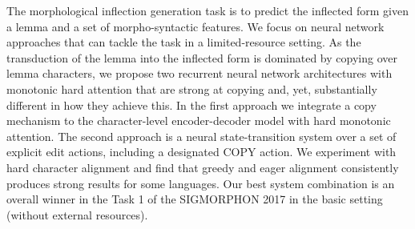 The morphological inflection generation task is to predict the inflected form given a lemma and a set of morpho-syntactic features. We focus on neural network approaches that can tackle the task in a limited-resource setting. As the transduction of the lemma into the inflected form is dominated by copying over lemma characters, we propose two recurrent neural network architectures with monotonic hard attention that are strong at copying and, yet, substantially different in how they achieve this. In the first approach we integrate a copy mechanism to the character-level encoder-decoder model with hard monotonic attention. The second approach is a neural state-transition system over a set of explicit edit actions, including a designated COPY action. We experiment with hard character alignment and find that greedy and eager alignment consistently produces strong results for some languages. Our best system combination is an overall winner in the Task 1 of the SIGMORPHON 2017 in the basic setting (without external resources).
